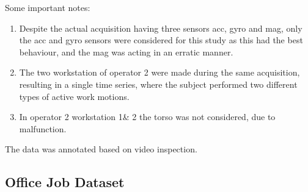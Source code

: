 Some important notes:
\begin{enumerate}
\item Despite the actual acquisition having three sensors \gls{acc}, \gls{gyro} and \gls{mag}, only the \gls{acc} and \gls{gyro} sensors were considered for this study as this had the best behaviour, and the \gls{mag} was acting in an erratic manner.
\item The two workstation of operator 2 were made during the same acquisition, resulting in a single time series, where the subject performed two different types of active work motions.
\item In operator 2 workstation 1\& 2 the torso was not considered, due to malfunction.
\end{enumerate}


The data was annotated based on video inspection.

\subsection{Office Job Dataset}
